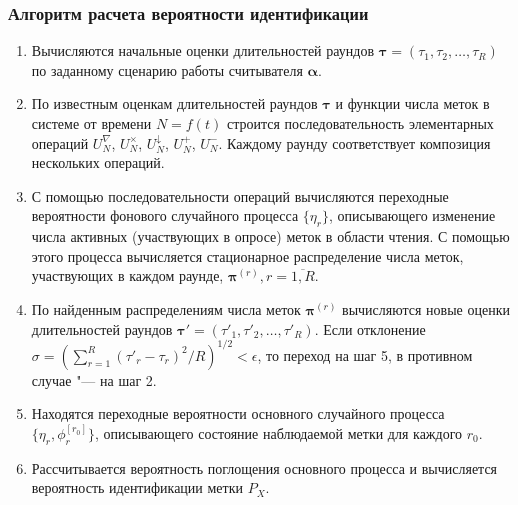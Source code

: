 \begin{frame}
    \frametitle{Алгоритм расчета вероятности идентификации}
    \footnotesize
    \begin{enumerate}
        \item Вычисляются начальные оценки длительностей раундов $\bm{\tau} = (\tau_1, \tau_2, \dots, \tau_R)$ по заданному сценарию работы считывателя $\bm{\alpha}$.
        \item По известным оценкам длительностей раундов $\bm{\tau}$ и функции числа меток в системе от времени $N = f(t)$ строится последовательность элементарных операций $U^{\nabla}_N$, $U^{\times}_N$, $U^{\downarrow}_N$, $U^{+}_N$, $U^{-}_N$. Каждому раунду соответствует композиция нескольких операций.
        \item С помощью последовательности операций вычисляются переходные вероятности фонового случайного процесса $\{\eta_r\}$, описывающего изменение числа активных (участвующих в опросе) меток в области чтения. С помощью этого процесса вычисляется стационарное распределение числа меток, участвующих в каждом раунде, $\bm{\pi}^{(r)}, r = \overline{1,R}$.
        \item По найденным распределениям числа меток $\bm{\pi}^{(r)}$ вычисляются новые оценки длительностей раундов $\bm{\tau}' = (\tau'_1, \tau'_2, \dots, \tau'_R)$. Если отклонение $\sigma = (\sum_{r=1}^R (\tau'_r - \tau_r)^2 / R)^{1/2} < \epsilon$, то переход на шаг 5, в противном случае "--- на шаг 2.
        \item Находятся переходные вероятности основного случайного процесса $\{ \eta_r, \phi_r^{[r_0]} \}$, описывающего состояние наблюдаемой метки для каждого $r_0$.
        \item Рассчитывается вероятность поглощения основного процесса и вычисляется вероятность идентификации метки $P_X$.
    \end{enumerate}
\end{frame}


